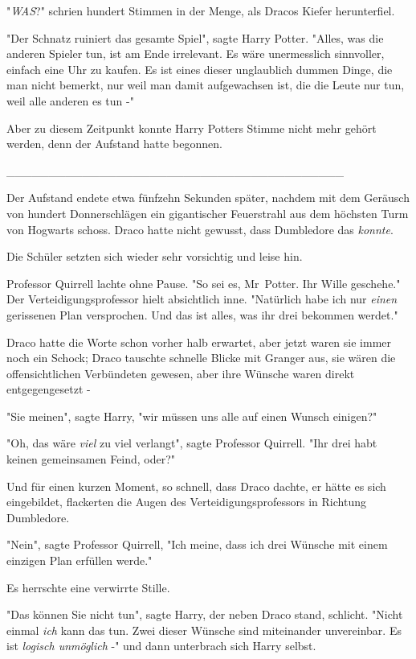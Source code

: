 {"\emph{WAS}?" schrien hundert Stimmen in der Menge, als Dracos Kiefer herunterfiel.

"Der Schnatz ruiniert das gesamte Spiel", sagte Harry Potter. "Alles, was die anderen Spieler tun, ist am Ende irrelevant. Es wäre unermesslich sinnvoller, einfach eine Uhr zu kaufen. Es ist eines dieser unglaublich dummen Dinge, die man nicht bemerkt, nur weil man damit aufgewachsen ist, die die Leute nur tun, weil alle anderen es tun -"

Aber zu diesem Zeitpunkt konnte Harry Potters Stimme nicht mehr gehört werden, denn der Aufstand hatte begonnen.

\_\_\_\_\_\_\_\_\_\_\_\_\_\_\_\_\_\_\_\_\_\_\_\_\_\_\_\_\_\_\_\_\_\_\_\_\_\_\_\_

Der Aufstand endete etwa fünfzehn Sekunden später, nachdem mit dem Geräusch von hundert Donnerschlägen ein gigantischer Feuerstrahl aus dem höchsten Turm von Hogwarts schoss. Draco hatte nicht gewusst, dass Dumbledore das \emph{konnte}.

Die Schüler setzten sich wieder sehr vorsichtig und leise hin.

Professor Quirrell lachte ohne Pause. "So sei es, Mr~Potter. Ihr Wille geschehe." Der Verteidigungsprofessor hielt absichtlich inne. "Natürlich habe ich nur \emph{einen} gerissenen Plan versprochen. Und das ist alles, was ihr drei bekommen werdet."

Draco hatte die Worte schon vorher halb erwartet, aber jetzt waren sie immer noch ein Schock; Draco tauschte schnelle Blicke mit Granger aus, sie wären die offensichtlichen Verbündeten gewesen, aber ihre Wünsche waren direkt entgegengesetzt -

"Sie meinen", sagte Harry, "wir müssen uns alle auf einen Wunsch einigen?"

"Oh, das wäre \emph{viel} zu viel verlangt", sagte Professor Quirrell. "Ihr drei habt keinen gemeinsamen Feind, oder?"

Und für einen kurzen Moment, so schnell, dass Draco dachte, er hätte es sich eingebildet, flackerten die Augen des Verteidigungsprofessors in Richtung Dumbledore.

"Nein", sagte Professor Quirrell, "Ich meine, dass ich drei Wünsche mit einem einzigen Plan erfüllen werde."

Es herrschte eine verwirrte Stille.

"Das können Sie nicht tun", sagte Harry, der neben Draco stand, schlicht. "Nicht einmal \emph{ich} kann das tun. Zwei dieser Wünsche sind miteinander unvereinbar. Es ist \emph{logisch unmöglich} -" und dann unterbrach sich Harry selbst.

}
